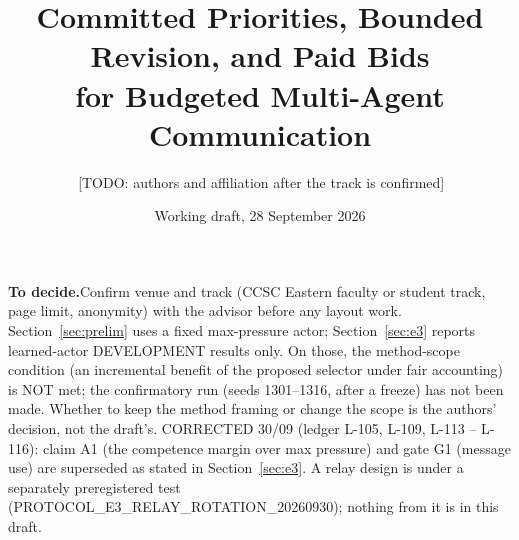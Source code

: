 \documentclass[11pt]{article}
\theoremstyle{definition}
\newif\ifshownotes\shownotestrue
\newcommand{\TODO}[1]{\ifshownotes{\color{todocol}\,\textsf{\footnotesize[TODO: #1]}}\fi}
\newcommand{\TODOPAR}[1]{\ifshownotes\par\vspace{2pt}\noindent%
  {\color{todocol}\textsf{\footnotesize\textbf{To decide.}\;#1}}\par\vspace{2pt}\fi}
\begin{document}
\title{Committed Priorities, Bounded Revision, and Paid Bids\\for Budgeted Multi-Agent Communication}
\author{\TODO{authors and affiliation after the track is confirmed}}
\date{Working draft, 28 September 2026}
\maketitle

\TODOPAR{Confirm venue and track (CCSC Eastern faculty or student track, page limit, anonymity) with
the advisor before any layout work. Section~\ref{sec:prelim} uses a fixed max-pressure actor;
Section~\ref{sec:e3} reports learned-actor DEVELOPMENT results only. On those, the method-scope
condition (an incremental benefit of the proposed selector under fair accounting) is NOT met; the
confirmatory run (seeds 1301--1316, after a freeze) has not been made. Whether to keep the method
framing or change the scope is the authors' decision, not the draft's.
CORRECTED 30/09 (ledger L-105, L-109, L-113 -- L-116): claim A1 (the competence margin over max pressure) and gate G1
(message use) are superseded as stated in Section~\ref{sec:e3}. A relay design is under a separately preregistered test
(PROTOCOL\_E3\_RELAY\_ROTATION\_20260930); nothing from it is in this draft.}
\end{document}
